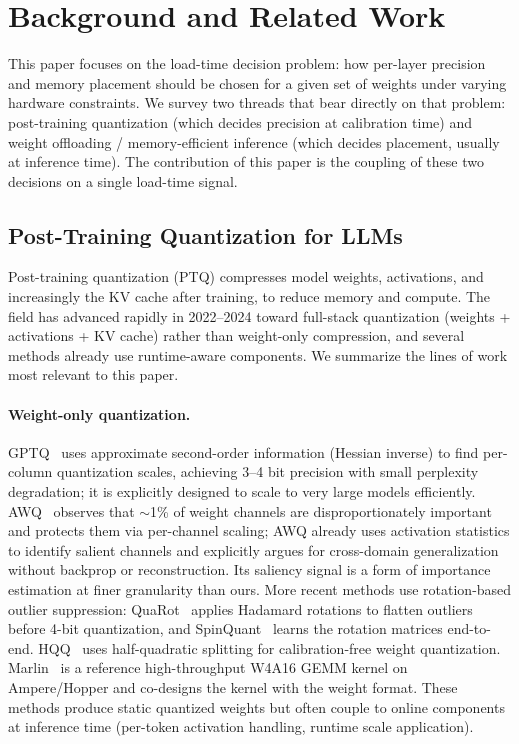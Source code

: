 \documentclass{article}
\begin{document}
\section{Background and Related Work}
\label{sec:related}

This paper focuses on the load-time decision problem: how per-layer
precision and memory placement should be chosen for a given set of
weights under varying hardware constraints. We survey two threads that
bear directly on that problem: post-training quantization (which decides
precision at calibration time) and weight offloading / memory-efficient
inference (which decides placement, usually at inference time). The
contribution of this paper is the coupling of these two decisions on a
single load-time signal.

\subsection{Post-Training Quantization for LLMs}

Post-training quantization (PTQ) compresses model weights, activations,
and increasingly the KV cache after training, to reduce memory and
compute. The field has advanced rapidly in 2022--2024 toward full-stack
quantization (weights + activations + KV cache) rather than weight-only
compression, and several methods already use runtime-aware components.
We summarize the lines of work most relevant to this paper.

\paragraph{Weight-only quantization.} GPTQ~\cite{frantar2022gptq} uses
approximate second-order information (Hessian inverse) to find per-column
quantization scales, achieving 3--4 bit precision with small perplexity
degradation; it is explicitly designed to scale to very large models
efficiently. AWQ~\cite{lin2023awq} observes that $\sim$1\% of weight channels are
disproportionately important and protects them via per-channel scaling;
AWQ already uses activation statistics to identify salient channels and
explicitly argues for cross-domain generalization without backprop or
reconstruction. Its saliency signal is a form of importance estimation
at finer granularity than ours. More recent methods use rotation-based outlier
suppression: QuaRot~\cite{ashkboos2024quarot} applies Hadamard rotations to
flatten outliers before 4-bit quantization, and
SpinQuant~\cite{liu2024spinquant} learns the rotation matrices end-to-end.
HQQ~\cite{badri2023hqq} uses half-quadratic splitting for calibration-free
weight quantization. Marlin~\cite{frantar2024marlin} is a reference
high-throughput W4A16 GEMM kernel on Ampere/Hopper and co-designs the
kernel with the weight format. These methods produce static quantized
weights but often couple to online components at inference time
(per-token activation handling, runtime scale application).
\end{document}

